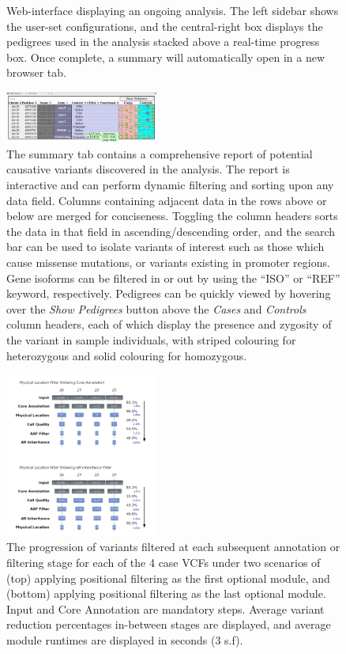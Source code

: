 \documentclass[twocolumn]{bmcart}%
\begin{document}
\begin{backmatter}
\begin{figure}[h!]
\caption{\csentence{}Web-interface displaying an ongoing analysis. The left sidebar shows the user-set configurations, and the central-right box displays the pedigrees used in the analysis stacked above a real-time progress box. Once complete, a summary will automatically open in a new browser tab.\label{fig2}}
\end{figure}
\begin{figure}[h!]
  \centerline{\includegraphics[width=0.45\textwidth]{fig3.png}}
\caption{\csentence{}The summary tab contains a comprehensive report of potential causative variants discovered in the analysis. The report is interactive and can perform dynamic filtering and sorting upon any data field. Columns containing adjacent data in the rows above or below are merged for conciseness. Toggling the column headers sorts the data in that field in ascending/descending order, and the search bar can be used to isolate variants of interest such as those which cause missense mutations, or variants existing in promoter regions. Gene isoforms can be filtered in or out by using the ``ISO'' or ``REF'' keyword, respectively. Pedigrees can be quickly viewed by hovering over the \textit{Show Pedigrees} button above the \textit{Cases} and \textit{Controls} column headers, each of which display the presence and zygosity of the variant in sample individuals, with striped colouring for heterozygous and solid colouring for homozygous.
\label{fig3}}
\end{figure}
\begin{figure}[h!]
  \centerline{\includegraphics[width=0.45\textwidth]{fig4.png}}
\caption{\csentence{}The progression of variants filtered at each subsequent annotation or filtering stage for each of the 4 case VCFs under two scenarios of (top) applying positional filtering as the first optional module, and (bottom) applying positional filtering as the last optional module. Input and Core Annotation are mandatory steps. Average variant reduction percentages in-between stages are displayed, and average module runtimes are displayed in seconds (3 s.f).\label{fig4}}
\end{figure}



\end{backmatter}
\end{document}
